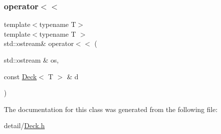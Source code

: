 \subsubsection{\texorpdfstring{operator$<$$<$}{operator<<}}
{\footnotesize\ttfamily template$<$typename T$>$ \\
template$<$typename T $>$ \\
std\+::ostream\& operator$<$$<$ (\begin{DoxyParamCaption}\item[{std\+::ostream \&}]{os,  }\item[{const \hyperlink{classpan_1_1detail_1_1_deck}{Deck}$<$ T $>$ \&}]{d }\end{DoxyParamCaption})\hspace{0.3cm}{\ttfamily [friend]}}



The documentation for this class was generated from the following file\+:\begin{DoxyCompactItemize}
\item 
detail/\hyperlink{_deck_8h}{Deck.\+h}\end{DoxyCompactItemize}
